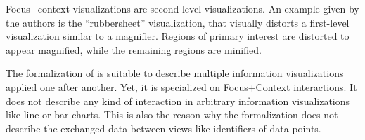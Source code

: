 Focus+context visualizations are second-level visualizations.
An example given by the authors is the  ``rubbersheet'' visualization, that visually distorts a first-level visualization similar to a magnifier.
Regions of primary interest are distorted to appear magnified, while the remaining regions are minified.

The formalization of \textcite{Bjork1999} is suitable to describe multiple information visualizations applied one after another.
Yet, it is specialized on Focus+Context interactions.
It does not describe any kind of interaction in arbitrary information visualizations like line or bar charts.
This is also the reason why the formalization does not describe the exchanged data between views like identifiers of data points.

